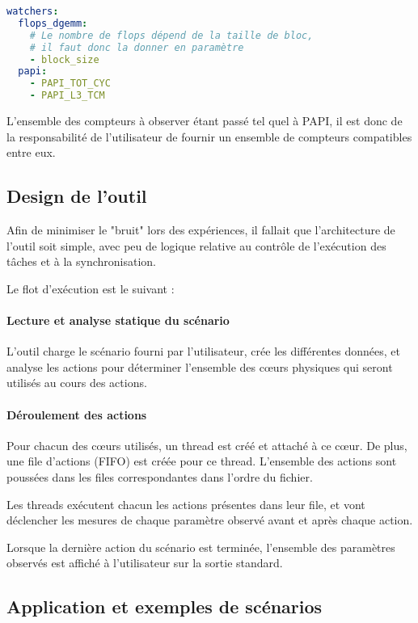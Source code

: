 \begin{lstlisting}[language=yaml,caption=Exemple de déclaration d'observateurs,label=lst:tool:watchers-example]
watchers:
  flops_dgemm:
    # Le nombre de flops dépend de la taille de bloc,
    # il faut donc la donner en paramètre
    - block_size
  papi:
    - PAPI_TOT_CYC
    - PAPI_L3_TCM
\end{lstlisting}

L'ensemble des compteurs à observer étant passé tel quel à PAPI, il est donc de la responsabilité de l'utilisateur de fournir un ensemble de compteurs compatibles entre eux.

\subsection{Design de l'outil}

Afin de minimiser le "bruit" lors des expériences, il fallait que l'architecture de l'outil soit simple, avec peu de logique relative au contrôle de l'exécution des tâches et à la synchronisation.

Le flot d'exécution est le suivant :

\paragraph{Lecture et analyse statique du scénario}
L'outil charge le scénario fourni par l'utilisateur, crée les différentes données, et analyse les actions pour déterminer l'ensemble des cœurs physiques qui seront utilisés au cours des actions.

\paragraph{Déroulement des actions}
Pour chacun des cœurs utilisés, un thread est créé et attaché à ce cœur. De plus, une file d'actions (FIFO) est créée pour ce thread.
L'ensemble des actions sont poussées dans les files correspondantes dans l'ordre du fichier.

Les threads exécutent chacun les actions présentes dans leur file, et vont déclencher les mesures de chaque paramètre observé avant et après chaque action.

Lorsque la dernière action du scénario est terminée, l'ensemble des paramètres observés est affiché à l'utilisateur sur la sortie standard.

\subsection{Application et exemples de scénarios}

